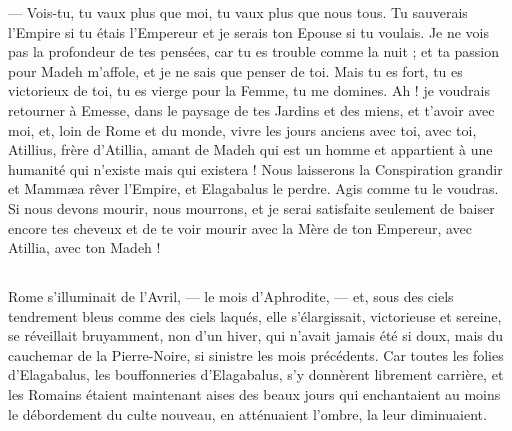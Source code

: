 \documentclass[a4paper, 11pt, oneside, polutonikogreek, french]{article}
\begin{document}
--- Vois-tu, tu vaux plus que moi, tu vaux plus que nous tous. Tu sauverais l'Empire si tu étais l'Empereur et je serais ton Epouse si tu voulais. Je ne vois pas la profondeur de tes pensées, car tu es trouble comme la nuit ; et ta passion pour Madeh m'affole, et je ne sais que penser de toi. Mais tu es fort, tu es victorieux de toi, tu es vierge pour la Femme, tu me domines. Ah ! je voudrais retourner à Emesse, dans le paysage de tes Jardins et des miens, et t'avoir avec moi, et, loin de Rome et du monde, vivre les jours anciens avec toi, avec toi, Atillius, frère d'Atillia, amant de Madeh qui est un homme et appartient à une humanité qui n'existe mais qui existera ! Nous laisserons la Conspiration grandir et Mammæa rêver l'Empire, et Elagabalus le perdre. Agis comme tu le voudras. Si nous devons mourir, nous mourrons, et je serai satisfaite seulement de baiser encore tes cheveux et de te voir mourir avec la Mère de ton Empereur, avec Atillia, avec ton Madeh !
\clearpage
\subsection{}
\paragraph{}
Rome s'illuminait de l'Avril, --- le mois d'Aphrodite, --- et, sous des ciels tendrement bleus comme des ciels laqués, elle s'élargissait, victorieuse et sereine, se réveillait bruyamment, non d'un hiver, qui n'avait jamais été si doux, mais du cauchemar de la Pierre-Noire, si sinistre les mois précédents. Car toutes les folies d'Elagabalus, les bouffonneries d'Elagabalus, s'y donnèrent librement carrière, et les Romains étaient maintenant aises des beaux jours qui enchantaient au moins le débordement du culte nouveau, en atténuaient l'ombre, la leur diminuaient.
\end{document}
